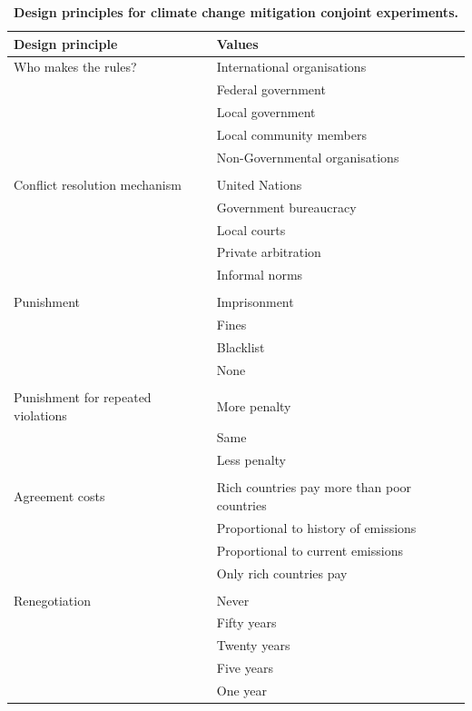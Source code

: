\documentclass[a4paper,12pt]{article}
\begin{document}
\begin{table}[ht]
  \begin{center}
      \caption{\textbf{Design principles for climate change mitigation conjoint experiments.}}
      \label{tab:categories}
    \begin{tabular}{l|l}
      \toprule
      \textbf{Design principle} & \textbf{Values} \\
      \midrule
      Who makes the rules? & International organisations \\ 
	  & Federal government \\ 
	  & Local government \\ 
	  & Local community members \\
	  & Non-Governmental organisations \\
	  & \\
      Conflict resolution mechanism & United Nations \\
	  & Government bureaucracy \\
	  & Local courts \\
	  & Private arbitration \\
	  & Informal norms \\
	  & \\
      Punishment & Imprisonment \\
	  & Fines \\
	  & Blacklist \\
	  & None \\
	  & \\
	  Punishment for repeated violations & More penalty \\
	  & Same \\
	  & Less penalty \\
	  & \\
	  Agreement costs & Rich countries pay more than poor countries \\
      & Proportional to history of emissions \\ 
      & Proportional to current emissions \\
	  & Only rich countries pay\\
	  & \\
	  Renegotiation & Never \\
	  & Fifty years \\
	  & Twenty years \\
	  & Five years \\
	  & One year \\
      \bottomrule
    \end{tabular}
  \end{center}
\end{table}
\end{document}
